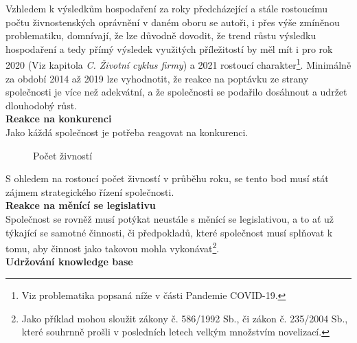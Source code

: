 \newpage

 Vzhledem k výsledkům hospodaření za roky předcházející a stále rostoucímu počtu živnostenských oprávnění v daném oboru se autoři, i přes výše zmíněnou problematiku, domnívají, že lze důvodně dovodit, že trend růstu výsledku hospodaření a tedy přímý výsledek využitých příležitostí by měl mít i pro rok 2020 (Viz kapitola \textit{C. Životní cyklus firmy}) a 2021 rostoucí charakter\footnote{Viz problematika popsaná níže v části Pandemie COVID-19.}. Minimálně za období 2014 až 2019 lze vyhodnotit, že reakce na poptávku ze strany společnosti je více než adekvátní, a že společnosti se podařilo dosáhnout a udržet dlouhodobý růst.\\



\textbf{Reakce na konkurenci}\\

Jako káždá společnost je potřeba reagovat na konkurenci.

\begin{figure}[!htbp]
	\caption[Počet živností]{Počet živností}
	\label{fig:Pocet zivnosti}
\end{figure}

S ohledem na rostoucí počet živností v průběhu roku, se tento bod musí stát zájmem strategického řízení společnosti.\\

\textbf{Reakce na měnící se legislativu}\\

Společnost se rovněž musí potýkat neustále s měnící se legislativou, a to ať už týkající se samotné činnosti, či předpokladů, které společnost musí splňovat k tomu, aby činnost jako takovou mohla vykonávat\footnote{Jako příklad mohou sloužit zákony č. 586/1992 Sb., či zákon č. 235/2004 Sb., které souhrnně prošli v posledních letech velkým množstvím novelizací.}.\\

\textbf{Udržování knowledge base}\\

